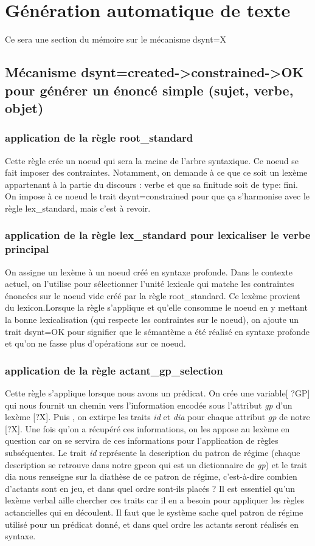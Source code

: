 \chapter{Génération automatique de texte}

Ce sera une section du mémoire sur le mécanisme dsynt=X

\section{Mécanisme dsynt=created->constrained->OK pour générer un énoncé simple (sujet, verbe, objet)}

\subsection{application de la règle root{\_}standard}
Cette règle crée un noeud qui sera la racine de l'arbre syntaxique. Ce noeud se fait imposer des contraintes. Notamment, on demande à ce que ce soit un lexème appartenant à la partie du discours : verbe et que sa finitude soit de type: fini. On impose à ce noeud le trait dsynt=constrained pour que ça s'harmonise avec le règle lex{\_}standard, mais c'est à revoir.

\subsection{application de la règle lex{\_}standard pour lexicaliser le verbe principal}
On assigne un lexème à un noeud  créé en syntaxe profonde. Dans le contexte actuel, on l'utilise pour sélectionner l'unité lexicale qui matche les contraintes énoncées sur le noeud vide créé par la règle root{\_}standard. Ce lexème provient du lexicon.Lorsque la règle s'applique et qu'elle consomme le noeud en y mettant la bonne lexicalisation (qui respecte les contraintes sur le noeud), on ajoute un trait dsynt=OK pour signifier que le sémantème a été réalisé en syntaxe profonde et qu'on ne fasse plus d'opérations sur ce noeud.

\subsection{application de la règle actant{\_}gp{\_}selection}
Cette règle s'applique lorsque nous avons un prédicat.
On crée une variable[ ?GP] qui nous fournit un chemin vers l'information encodée sous l'attribut \emph{ gp} d'un lexème [?X]. Puis , on extirpe les traits \emph{ id} et \emph{dia} pour chaque attribut\emph{ gp} de notre [?X]. Une fois qu'on a récupéré ces informations, on les appose au lexème en question car on se servira de ces informations pour l'application de règles subséquentes. Le trait \emph{ id} représente la description du patron de régime (chaque description se retrouve dans notre gpcon qui est un dictionnaire de\emph{ gp}) et le trait dia nous renseigne sur la diathèse de ce patron de régime, c'est-à-dire combien d'actants sont en jeu, et dans quel ordre sont-ils placés ? Il est essentiel qu'un lexème verbal aille chercher ces traits car il en a besoin pour appliquer les règles actancielles qui en découlent. Il faut que le système sache quel patron de régime utilisé pour un prédicat donné, et dans quel ordre les actants seront réalisés en syntaxe.

